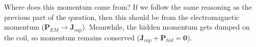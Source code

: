 \documentclass[a4paper]{scrartcl}
\begin{document}
Where does this momentum come from? If we follow the same reasoning as the previous part of the question, then this should be from the electromagnetic momentum (\(\mathbf{P}_{EM} \to \mathbf{J}_{cap}\)). Meanwhile, the hidden momentum gets dumped on the coil, so momentum remains conserved (\(\mathbf{J}_{cap} + \mathbf{P}_{hid} = \mathbf{0}\)).
\end{document}
